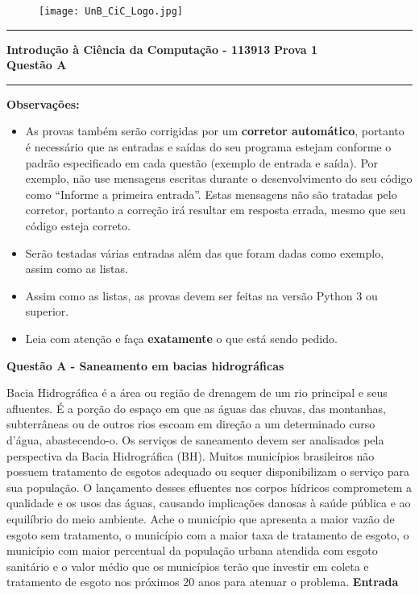 \documentclass[a4paper, 12pt]{article}
\begin{document}
\begin{figure}[H]
	\texttt{[image: UnB\_CiC\_Logo.jpg]}
\end{figure}
\noindent\rule{\textwidth}{0.4pt}
\begin{center}
	\textbf{{\Large Introdução à Ciência da Computação - 113913}} \newline \newline
	\textbf{{\large Prova 1} \\
	\vspace{9pt}
	{\large Questão A}} \\
	\noindent\rule{\textwidth}{0.4pt}
	\newline
\end{center}

\textbf{{\large Observações:}}
\begin{itemize}
	\item As provas também serão corrigidas por um \textbf{corretor automático}, portanto é necessário que as entradas e saídas do seu programa estejam conforme o padrão especificado em cada questão (exemplo de entrada e saída). Por exemplo, não use mensagens escritas durante o desenvolvimento do seu código como “Informe a primeira entrada”. Estas mensagens não são tratadas pelo corretor, portanto a correção irá resultar em resposta errada, mesmo que seu código esteja correto.
	\item Serão testadas várias entradas além das que foram dadas como exemplo, assim como as listas.
	\item Assim como as listas, as provas devem ser feitas na versão Python 3 ou superior.
	\item Leia com atenção e faça \textbf{exatamente} o que está sendo pedido.
\end{itemize}
\newpage %
\begin{center}
\textbf{{\Large Questão A - Saneamento em bacias hidrográficas}}
\end{center}
\vspace{5pt}

Bacia Hidrográfica é a área ou região de drenagem de um rio principal e seus afluentes. É a porção do espaço em que as águas das chuvas, das montanhas, subterrâneas ou de outros rios escoam em direção a um determinado curso d’água, abastecendo-o. Os serviços de saneamento devem ser analisados pela perspectiva da Bacia Hidrográfica (BH).  Muitos municípios brasileiros não possuem tratamento de esgotos adequado ou sequer disponibilizam o serviço para sua população. O lançamento desses efluentes nos corpos hídricos comprometem a qualidade e os usos das águas, causando implicações danosas à saúde pública e ao equilíbrio do meio ambiente. Ache o município que apresenta a maior vazão de esgoto sem tratamento, o município com a maior taxa de tratamento de esgoto, o município com maior percentual da população urbana atendida com esgoto sanitário e o valor médio que os municípios terão que investir em coleta e tratamento de esgoto nos próximos 20 anos para atenuar o problema. 
\newline \newline
\textbf{{\large Entrada}} \newline
\end{document}
